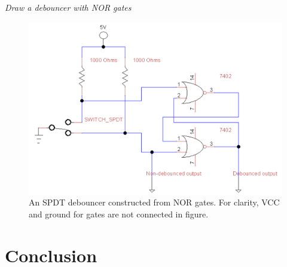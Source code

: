 \documentclass[11pt]{article}
\begin{document}
{\em Draw a debouncer with NOR gates}
\begin{figure}[h]
	\centering
	\includegraphics[scale=0.5, draft=false]{nor_gates}
	\caption{An SPDT debouncer constructed from NOR gates. For clarity, VCC and ground for gates are not connected in figure.}
	\label{fig:nor_gates}
\end{figure}

\section{Conclusion}
\end{document}
